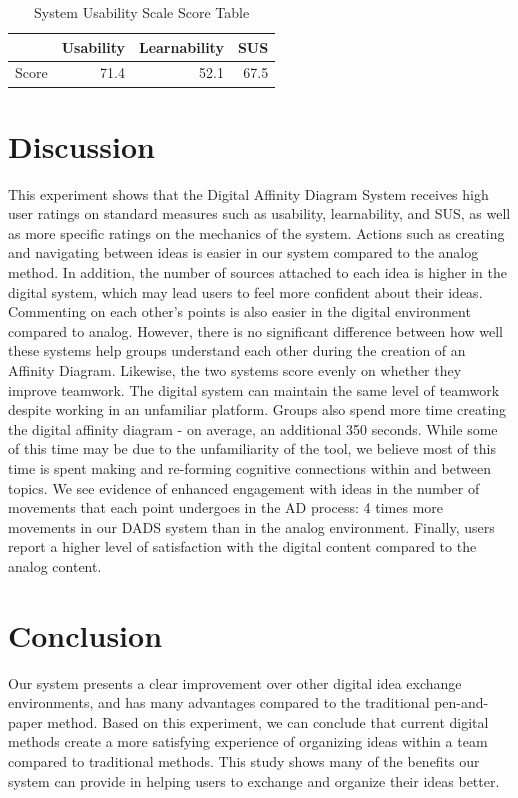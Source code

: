 \documentclass{sigchi}
\begin{document}
\begin{table}[ht]
\centering
\caption{ System Usability Scale Score Table}

\begin{tabular}{rrrr}
  \hline
 & Usability  & Learnability & SUS  \\ 
  \hline
Score  & 71.4 & 52.1 & 67.5 \\ 

   \hline
\end{tabular}
\end{table}


\section{Discussion}

This experiment shows that the Digital Affinity Diagram System receives high user ratings on standard measures such as usability, learnability, and SUS, as well as more specific ratings on the mechanics of the system. Actions such as creating and navigating between ideas is easier in our system compared to the analog method. In addition, the number of sources attached to each idea is higher in the digital system, which may lead users to feel more confident about their ideas. Commenting on each other's points is also easier in the digital environment compared to analog. However, there is no significant difference between how well these systems help groups understand each other during the creation of an Affinity Diagram. Likewise, the two systems score evenly on whether they improve teamwork. The digital system can maintain the same level of teamwork despite working in an unfamiliar platform. Groups also spend more time creating the digital affinity diagram - on average, an additional 350 seconds.  While some of this time may be due to the unfamiliarity of the tool, we believe most of this time is spent making and re-forming cognitive connections within and between topics. We see evidence of enhanced engagement with ideas in the number of movements that each point undergoes in the AD process: 4 times more movements in our DADS system than in the analog environment. Finally, users report a higher level of satisfaction with the digital content compared to the analog content. 

\section{Conclusion}
Our system presents a clear improvement over other digital idea exchange environments, and has many advantages compared to the traditional pen-and-paper method. Based on this experiment, we can conclude that current digital methods create a more satisfying experience of organizing ideas within a team compared to traditional methods. This study shows many of the benefits our system can provide in helping users to exchange and organize their ideas better. 
\end{document}
